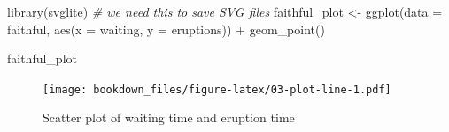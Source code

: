 \documentclass[
]{krantz}
\makeatletter
\newenvironment{Shaded}{\begin{snugshade}}{\end{snugshade}}
\newcommand{\AttributeTok}[1]{\textcolor[rgb]{0.61,0.61,0.61}{#1}}
\newcommand{\CommentTok}[1]{\textcolor[rgb]{0.37,0.37,0.37}{\textit{#1}}}
\newcommand{\FunctionTok}[1]{\textcolor[rgb]{0,0,0}{#1}}
\newcommand{\NormalTok}[1]{#1}
\newcommand{\OtherTok}[1]{\textcolor[rgb]{0.37,0.37,0.37}{#1}}
\newcommand{\SpecialCharTok}[1]{\textcolor[rgb]{0,0,0}{#1}}
\newenvironment{kframe}{%
\medskip{}
\setlength{\fboxsep}{.8em}
 \def\at@end@of@kframe{}%
 \ifinner\ifhmode%
  \def\at@end@of@kframe{\end{minipage}}%
  \begin{minipage}{\columnwidth}%
 \fi\fi%
 \def\FrameCommand##1{\hskip\@totalleftmargin \hskip-\fboxsep
 \colorbox{shadecolor}{##1}\hskip-\fboxsep
     \hskip-\linewidth \hskip-\@totalleftmargin \hskip\columnwidth}%
 \MakeFramed {\advance\hsize-\width
   \@totalleftmargin\z@ \linewidth\hsize
   \@setminipage}}%
 {\par\unskip\endMakeFramed%
 \at@end@of@kframe}
\renewenvironment{Shaded}{\begin{kframe}}{\end{kframe}}
\makeatother
\begin{document}
\begin{Shaded}
\begin{Highlighting}[]
\FunctionTok{library}\NormalTok{(svglite) }\CommentTok{\# we need this to save SVG files}
\NormalTok{faithful\_plot }\OtherTok{\textless{}{-}} \FunctionTok{ggplot}\NormalTok{(}\AttributeTok{data =}\NormalTok{ faithful, }\FunctionTok{aes}\NormalTok{(}\AttributeTok{x =}\NormalTok{ waiting, }\AttributeTok{y =}\NormalTok{ eruptions)) }\SpecialCharTok{+}
  \FunctionTok{geom\_point}\NormalTok{()}

\NormalTok{faithful\_plot}
\end{Highlighting}
\end{Shaded}

\begin{figure}
\centering
\texttt{[image: bookdown\_files/figure-latex/03-plot-line-1.pdf]}
\caption{\label{fig:03-plot-line}Scatter plot of waiting time and eruption time}
\end{figure}
\end{document}
